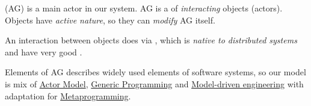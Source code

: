 \clearpage{}\secdown

\noindent {} (AG) is a main actor in our system. AG is a
 of \emph{interacting} objects (actors). Objects have
\emph{active nature}, so they can \emph{modify} AG itself.

\medskip\noindent
An interaction between objects does via , which is
\emph{native to distributed systems} and have very good .

\medskip\noindent
Elements of AG describes widely used elements of software systems, so our model
is mix of \href{http://en.wikipedia.org/wiki/Actor_model}{Actor Model},
\href{http://en.wikipedia.org/wiki/Generic_programming}{Generic Programming}
and \href{http://en.wikipedia.org/wiki/Model-driven_engineering}{Model-driven
engineering} with adaptation for
\href{http://en.wikipedia.org/wiki/Metaprogramming}{Metaprogramming}.




\secup
